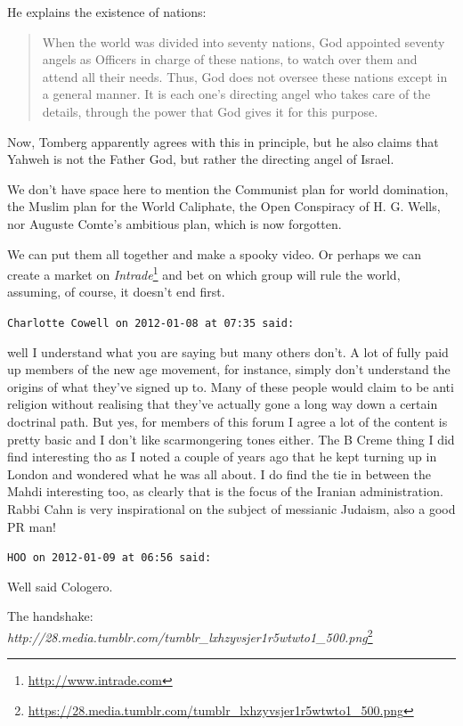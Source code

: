 \begin{footnotesize}
\begin{sffamily}
He explains the existence of nations:

\begin{quote}

When the world was divided into seventy nations, God appointed seventy angels as Officers in charge of these nations, to watch over them and attend all their needs. Thus, God does not oversee these nations except in a general manner. It is each one's directing angel who takes care of the details, through the power that God gives it for this purpose.
\end{quote}


Now, Tomberg apparently agrees with this in principle, but he also claims that Yahweh is not the Father God, but rather the directing angel of Israel.

We don't have space here to mention the Communist plan for world domination, the Muslim plan for the World Caliphate, the Open Conspiracy of H. G. Wells, nor Auguste Comte's ambitious plan, which is now forgotten.

We can put them all together and make a spooky video. Or perhaps we can create a market on \textit{Intrade}\footnote{\url{http://www.intrade.com}} and bet on which group will rule the world, assuming, of course, it doesn't end first.

\hfill

\texttt{Charlotte Cowell on 2012-01-08 at 07:35 said:}

well I understand what you are saying but many others don't. A lot of fully paid up members of the new age movement, for instance, simply don't understand the origins of what they've signed up to. Many of these people would claim to be anti religion without realising that they've actually gone a long way down a certain doctrinal path. But yes, for members of this forum I agree a lot of the content is pretty basic and I don't like scarmongering tones either. The B Creme thing I did find interesting tho as I noted a couple of years ago that he kept turning up in London and wondered what he was all about. I do find the tie in between the Mahdi interesting too, as clearly that is the focus of the Iranian administration. Rabbi Cahn is very inspirational on the subject of messianic Judaism, also a good PR man!

\hfill

\texttt{HOO on 2012-01-09 at 06:56 said:}

Well said Cologero.

The handshake:\\
\textit{http://28.media.tumblr.com/tumblr\_lxhzyvsjer1r5wtwto1\_500.png}\footnote{\url{https://28.media.tumblr.com/tumblr\_lxhzyvsjer1r5wtwto1\_500.png}}



\end{sffamily}
\end{footnotesize}
